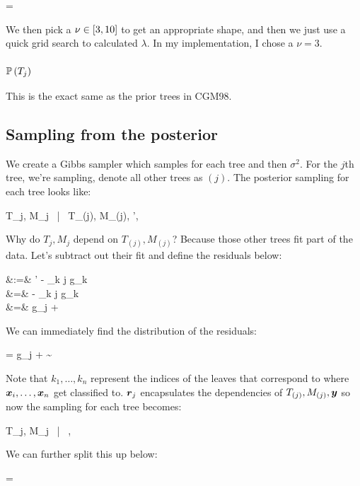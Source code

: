 \documentclass[12pt]{article}
\begin{document}
 = 
\eeqn

We then pick a $\nu \in \left[3,10\right]$ to get an appropriate shape, and then we just use a quick grid search to calculated $\lambda$. In my implementation, I chose a $\nu=3$.

\subsubsection{$\mathbb{P}\left(T_j\right)$}

This is the exact same as the prior trees in CGM98.

\subsection{Sampling from the posterior}

We create a Gibbs sampler which samples for each tree and then $\sigma^2$. For the $j$th tree, we're sampling, denote all other trees as $(j)$. The posterior sampling for each tree looks like:

\beqn
T_j, M_j ~|~ T_{(j)}, M_{(j)}, \y ', \sigsq
\eeqn

Why do $T_j, M_j$ depend on $T_{(j)}, M_{(j)}$? Because those other trees fit part of the data. Let's subtract out their fit and define the residuals below:

\beqn
\Rj &:=& \y ' - \sum_{k \neq j} g_k \\
&=&  - \sum_{k \neq j} g_k \\
&=& g_j + \beps
\eeqn

We can immediately find the distribution of the residuals:

\bneqn\label{eq:residual_dist}
\Rj = g_j + \beps \mathimplies \Rj \sim {} 
\eneqn

Note that $k_1, \ldots, k_n$ represent the indices of the leaves that correspond to where $\boldsymbol{x}_i, \ldots, \boldsymbol{x}_n$ get classified to. $\boldsymbol{r}_j$ encapsulates the dependencies of $T_{(j)}, M_{(j)}, \boldsymbol{y}$ so now the sampling for each tree becomes:

\beqn
T_j, M_j ~|~ \Rj, \sigsq
\eeqn

We can further split this up below:

\bneqn\label{eq:trees_and_leaves_posterior}
 =  
\eneqn

%
\end{document}
